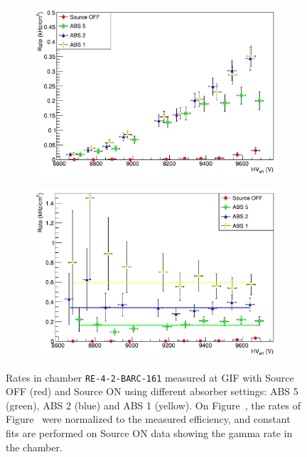 	\begin{figure}[H]
    	\begin{subfigure}{.5\linewidth}
			\centering
			\includegraphics[width = \linewidth]{fig/chapt5/Gamma-Rate.pdf}
        	\caption{\label{fig:GIFRate:A}}
    	\end{subfigure}
    	\begin{subfigure}{.5\linewidth}
			\centering
			\includegraphics[width = \linewidth]{fig/chapt5/Unconvoluted-Gamma-Rate.pdf}
        	\caption{\label{fig:GIFRate:B}}
    	\end{subfigure}
		\caption{\label{fig:GIFRate} Rates in chamber \texttt{RE-4-2-BARC-161} measured at GIF with Source OFF (red) and Source ON using different absorber settings: ABS 5 (green), ABS 2 (blue) and ABS 1 (yellow). On Figure~, the rates of Figure~ were normalized to the measured efficiency, and constant fits are performed on Source ON data showing the gamma rate in the chamber.}
	\end{figure}
	
